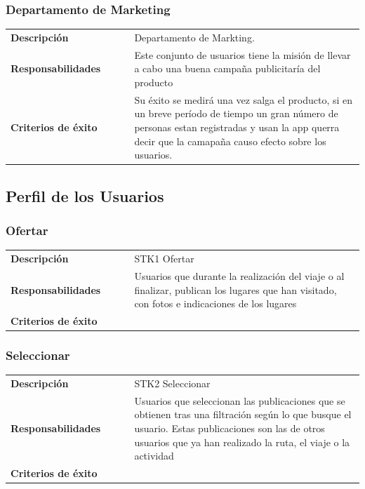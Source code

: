 \documentclass[11pt]{article}
\begin{document}
\subsubsection{Departamento de Marketing}
\begin{table}[H]
  \centering
  \begin{tabular}{p{0.35\linewidth}|p{0.65\linewidth}}
    \toprule
    \textbf{Descripción} & Departamento de Markting.\\ 
    \textbf{Responsabilidades} & Este conjunto de usuarios tiene la misión de llevar a cabo una buena campaña publicitaría del producto \\
    \textbf{Criterios de éxito} & Su éxito se medirá una vez salga el producto, si en un breve período de tiempo un gran número de personas estan registradas y usan la app querra decir que la camapaña causo efecto sobre los usuarios. \\
    \bottomrule
  \end{tabular}
\end{table}


\subsection{Perfil de los Usuarios}
\subsubsection{Ofertar}
\begin{table}[H]
  \centering
  \begin{tabular}{p{0.35\linewidth}|p{0.65\linewidth}}
    \toprule
    \textbf{Descripción} & STK1 Ofertar\\
    \textbf{Responsabilidades} & Usuarios que durante la realización del viaje o al finalizar, publican los lugares que han visitado, con fotos e indicaciones de los lugares\\
    \textbf{Criterios de éxito} &  \\
    \bottomrule
  \end{tabular}
\end{table}

\subsubsection{Seleccionar}
\begin{table}[H]
  \centering
  \begin{tabular}{p{0.35\linewidth}|p{0.65\linewidth}}
    \toprule
    \textbf{Descripción} & STK2 Seleccionar\\
    \textbf{Responsabilidades} & Usuarios que seleccionan las publicaciones que se obtienen tras una filtración según lo que busque el usuario. Estas publicaciones son las de otros usuarios que ya han realizado la ruta, el viaje o la actividad\\
    \textbf{Criterios de éxito} &  \\
    \bottomrule
  \end{tabular}
\end{table}
\end{document}
